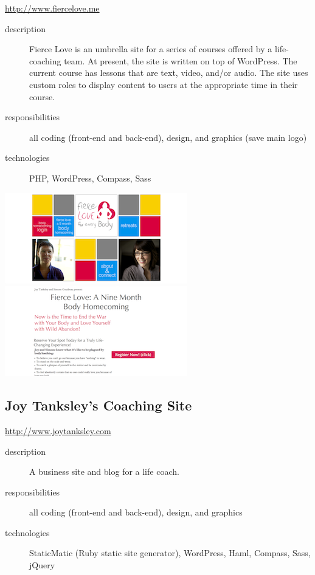 \documentclass{article}
\begin{document}
\href{http://www.fiercelove.me}{http://www.fiercelove.me}

\begin{description}
  \item[description] Fierce Love is an umbrella site for a series of courses offered by a life-coaching team.  At present, the site is written on top of WordPress.  The current course has lessons that are text, video, and/or audio.  The site uses custom roles to display content to users at the appropriate time in their course.
  \item[responsibilities] all coding (front-end and back-end), design, and graphics (save main logo)
  \item[technologies] PHP, WordPress, Compass, Sass
\end{description}

\includegraphics[scale=.5]{../source/images/portfolio/fierce-love-homepage-sm.png}
\includegraphics[scale=.5]{../source/images/portfolio/fierce-love-sales-sm.png}

\subsection{Joy Tanksley's Coaching Site} %
\label{sub:Joy Tanksley's Coaching Site}


\href{http://www.joytanksley.com}{http://www.joytanksley.com}

\begin{description}
  \item[description] A business site and blog for a life coach. 
  \item[responsibilities] all coding (front-end and back-end), design, and graphics 
  \item[technologies] StaticMatic (Ruby static site generator), WordPress, Haml, Compass, Sass, jQuery 
\end{description}
\end{document}
